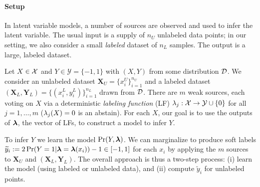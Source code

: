 \paragraph{Setup} In latent variable models, a number of sources are observed and used to infer the latent variable.
The usual input is a supply of $n_U$ unlabeled data points; in our setting, we also consider a small \emph{labeled} dataset of $n_L$ samples. The output is a large, labeled dataset.

Let $X \in \mathcal{X}$ and $Y \in \mathcal{Y} = \{-1, 1\}$ with $(X, Y)$ from some distribution $\mathcal{D}$. We consider an unlabeled dataset $\bm{X}_U = \{x_i^U\}_{i = 1}^{n_U}$ and a labeled dataset $(\bm{X}_L, \bm{Y}_L) = \{(x_i^L, y_i^L) \}_{i = 1}^{n_L}$ drawn from $\mathcal{D}$.
There are $m$ weak sources, each
voting on $X$ via a deterministic \textit{labeling function} (LF)
$\lambda_j: \mathcal{X} \rightarrow \mathcal{Y} \cup \{0\}$ for all
$j = 1, \dots, m$ ($\lambda_j(X) = 0$ is an abstain). 
For each $X$, our goal is to use the outputs of $\bm{\lambda}$, the vector of LFs, to construct a model to infer $Y$.

To infer $Y$ we learn the model $\Pr(Y, \bm{\lambda})$. We can marginalize to produce soft labels $\widetilde{y}_i := 2 \Pr(Y = 1 | \bm{\lambda} = \bm{\lambda}(x_i)) - 1 \in [-1, 1]$ for each $x_i$ by applying
the $m$ sources to $\bm{X}_U$ and $(\bm{X}_L, \bm{Y}_L)$. The overall approach is thus a two-step process: (i) learn the model (using labeled or unlabeled data), and (ii) compute $\tilde{y}_i$ for unlabeled points.



